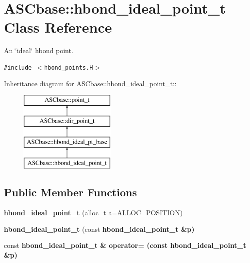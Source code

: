 \section{ASCbase::hbond\_\-ideal\_\-point\_\-t Class Reference}
\label{classASCbase_1_1hbond__ideal__point__t}
An \char`\"{}ideal\char`\"{} hbond point.  


{\tt \#include $<$hbond\_\-points.H$>$}

Inheritance diagram for ASCbase::hbond\_\-ideal\_\-point\_\-t::\begin{figure}[H]
\begin{center}
\leavevmode
\includegraphics[height=4cm]{classASCbase_1_1hbond__ideal__point__t}
\end{center}
\end{figure}
\subsection*{Public Member Functions}
\begin{CompactItemize}
\item 
\textbf{hbond\_\-ideal\_\-point\_\-t} (alloc\_\-t a=ALLOC\_\-POSITION)\label{classASCbase_1_1hbond__ideal__point__t_17edfda196584b6b9f2bd4c26ada8d7a}

\item 
\textbf{hbond\_\-ideal\_\-point\_\-t} (const \bf{hbond\_\-ideal\_\-point\_\-t} \&p)\label{classASCbase_1_1hbond__ideal__point__t_51934c9d9788021b09d2d24eb5b976e7}

\item 
const \bf{hbond\_\-ideal\_\-point\_\-t} \& \textbf{operator=} (const \bf{hbond\_\-ideal\_\-point\_\-t} \&p)\label{classASCbase_1_1hbond__ideal__point__t_9fcb68e2f672eebb7505ed413123a78c}

\end{CompactItemize}
